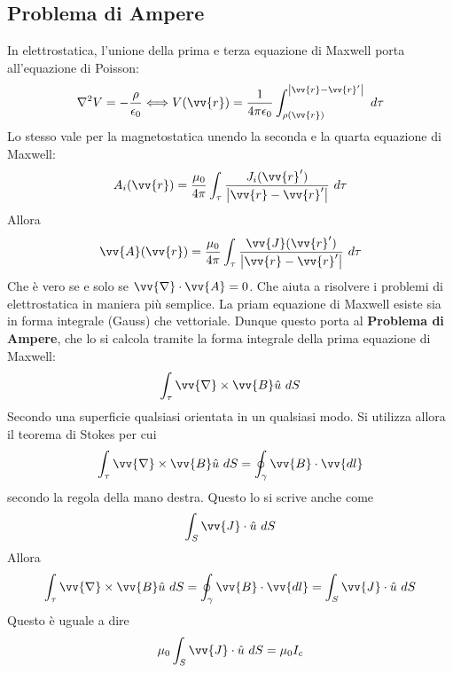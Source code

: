 \documentclass[a4paper, oneside]{article}
\begin{document}
\subsection{Problema di Ampere}
In elettrostatica, l'unione della prima e terza equazione di Maxwell porta 
all'equazione di Poisson:
\begin{align}
    \nabla^{2} V = - \frac{\rho}{\epsilon_0} \Longleftrightarrow V(\vv{r} ) = \frac{1}{4\pi\epsilon_0} \int_{\rho(\vv{r} )}^{\left| \vv{r} - \vv{r}'   \right| }  \ d\tau
\end{align}
Lo stesso vale per la magnetostatica  unendo la seconda e la quarta equazione di Maxwell:
\begin{align}
    A_i(\vv{r} ) = \frac{\mu_0}{4\pi} \int_{\tau} \frac{J_i(\vv{r}' )}{ \left| \vv{r} - \vv{r}'   \right| } \ d\tau 
\end{align}
Allora
\begin{align}
    \vv{A}(\vv{r} ) = \frac{\mu_0}{4\pi} \int_{\tau} \frac{\vv{J}(\vv{r}' ) }{\left| \vv{r} - \vv{r}'   \right| }  \ d\tau
\end{align}
Che è vero se e solo se $\vv{\nabla} \cdot \vv{A} = 0$. Che aiuta a risolvere i 
problemi di elettrostatica in maniera più semplice. La priam equazione di Maxwell 
esiste sia in forma integrale (Gauss) che vettoriale. Dunque questo porta
al \textbf{Problema di Ampere}, che lo si calcola tramite la forma integrale della prima equazione 
di Maxwell:
\begin{gather*}
    \int_{\tau} \vv{\nabla} \times \vv{B} \hat{u} \ dS    
\end{gather*}
Secondo una superficie qualsiasi orientata in un qualsiasi modo. Si utilizza allora 
il teorema di Stokes per cui
\begin{align}
        \int_{\tau} \vv{\nabla} \times \vv{B} \hat{u} \ dS = \oint_\gamma \vv{B} \cdot \vv{dl}  
\end{align}
secondo la regola della mano destra. Questo lo si scrive anche come 
\begin{gather*}
    \int_{S} \vv{J} \cdot \hat{u} \ dS   
\end{gather*}
Allora 
\begin{gather*}
    \int_{\tau} \vv{\nabla} \times \vv{B} \hat{u} \ dS = \oint_\gamma \vv{B} \cdot \vv{dl}  =     \int_{S} \vv{J} \cdot \hat{u} \ dS 
\end{gather*}
Questo è uguale a dire 
\begin{gather*}
    \mu_0 \int_{S} \vv{J} \cdot \hat{u} \ dS = \mu_0 I_c   
\end{gather*}
\end{document}
